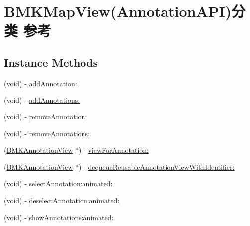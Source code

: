 \hypertarget{category_b_m_k_map_view_07_annotation_a_p_i_08}{}\section{B\+M\+K\+Map\+View(Annotation\+A\+P\+I)分类 参考}
\label{category_b_m_k_map_view_07_annotation_a_p_i_08}
\subsection*{Instance Methods}
\begin{DoxyCompactItemize}
\item 
(void) -\/ \hyperlink{category_b_m_k_map_view_07_annotation_a_p_i_08_a2af9ed45c3a7fd530dd414dc573327b3}{add\+Annotation\+:}
\item 
(void) -\/ \hyperlink{category_b_m_k_map_view_07_annotation_a_p_i_08_affd032313c55ae27814430b760e4aea0}{add\+Annotations\+:}
\item 
(void) -\/ \hyperlink{category_b_m_k_map_view_07_annotation_a_p_i_08_a6b6b75a5bf8b02854767f782a38d2009}{remove\+Annotation\+:}
\item 
(void) -\/ \hyperlink{category_b_m_k_map_view_07_annotation_a_p_i_08_a37fbe2b5db750affb4e0234cbf24a3c7}{remove\+Annotations\+:}
\item 
(\hyperlink{interface_b_m_k_annotation_view}{B\+M\+K\+Annotation\+View} $\ast$) -\/ \hyperlink{category_b_m_k_map_view_07_annotation_a_p_i_08_a0fb885234188aef28df944d5f636c70c}{view\+For\+Annotation\+:}
\item 
(\hyperlink{interface_b_m_k_annotation_view}{B\+M\+K\+Annotation\+View} $\ast$) -\/ \hyperlink{category_b_m_k_map_view_07_annotation_a_p_i_08_a4d4aa7a171876f3f66add8f86cca1e8c}{dequeue\+Reusable\+Annotation\+View\+With\+Identifier\+:}
\item 
(void) -\/ \hyperlink{category_b_m_k_map_view_07_annotation_a_p_i_08_a92dbf00c3eff2ede4d4ffd485c4059e0}{select\+Annotation\+:animated\+:}
\item 
(void) -\/ \hyperlink{category_b_m_k_map_view_07_annotation_a_p_i_08_a3d6bbc91bc3b66463ee97b3c909e4999}{deselect\+Annotation\+:animated\+:}
\item 
(void) -\/ \hyperlink{category_b_m_k_map_view_07_annotation_a_p_i_08_a62093e51bd52b357d909b75b4447b415}{show\+Annotations\+:animated\+:}
\end{DoxyCompactItemize}
